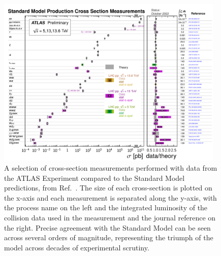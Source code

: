 \begin{figure}[htb]
    \centering
    \includegraphics[width=0.97\textwidth]{fig/atlas/atlas_xsecs_2023.pdf}
    \caption[A selection of cross-section measurements performed with data from the ATLAS Experiment]{
        A selection of cross-section measurements performed with data from the ATLAS Experiment compared to the Standard Model predictions, from Ref.~\cite{ATL-PHYS-PUB-2023-039}. 
        The size of each cross-section is plotted on the x-axis and each measurement is separated along the y-axis, with the process name on the left and the integrated luminosity of the collision data used in the measurement and the journal reference on the right. 
        Precise agreement with the Standard Model can be seen across several orders of magnitude, representing the triumph of the model across decades of experimental scrutiny. 
    }
    \label{fig:atlas_xsecs}
\end{figure}

